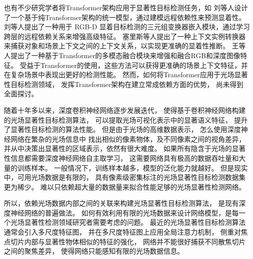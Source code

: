 也有不少研究学者将Transformer架构应用于显著性目标检测任务，如
刘等人设计了一个基于纯Transformer架构的统一模型，通过建模远程依赖性来预测显着性。
刘等人提出了一种用于 RGB-D 显着目标检测的三元组变换器嵌入模块，通过学习跨层的远程依赖关系来增强高级特征。 
塞里斯等人提出了一种上下文实例转换器来捕获对象和场景上下文之间的上下文关系，以实现更准确的显着性推断。 
王等人提出了一种基于Transformer的多模态融合模块来增强和融合RGB和深度图像特征。
受益于Transformer的使用，这些方法可以获得更准确的场景上下文特征，并在复杂场景中表现出更好的检测性能。 然而，如何将Transformer应用于光场显著性目标检测领域，
发挥Transformer架构在建立常成依赖方面的优势，
尚未得到全面探讨。 











随着十年多以来，深度卷积神经网络逐步发展迭代，
使得基于卷积神经网络构建的光场显著性目标检测算法，
可以提取光场可视化表示中的显著语义特征，
提升了显著性目标检测的算法性能。
但是由于光场的高维数据表示，
怎么使用深度神经网络在繁杂的光场信息中
找出相似的像素物体，及不同像素之间的视角差异，
并从中决策出显著性的区域表示，依然有很大难度。
如果所有隐含于光场的显著性信息都需要深度神经网络自主取学习，
这需要网络具有极高的数据吞吐量和大量的训练样本。
一般情况下，训练样本越多，模型的泛化能力就越好。
但是现实中，可用光场数据是有限的，
具有像素级密集标注的光场显著性目标检测数据集更为稀少。
难以只依赖超大量的数据量来拟合性能足够的光场显著性检测网络。






所以，依赖光场数据内部之间的关联来构建光场显著性目标检测算法，
是现有深度神经网络的普遍做法。
如何有效利用有限的光场数据来设计网络模型，是每一个光场显著性检测领域研究者需要考虑的问题。
最近的光场显著性目标检测算法通常会引入多尺度特征图，
并在多尺度特征图上应用全局注意力机制，
侧重对焦点切片内部与显著性物体相似的特征的强化，
网络并不能很好捕获不同散焦切片之间的聚焦差异，
使得网络只能感知有限的光场数据信息。




